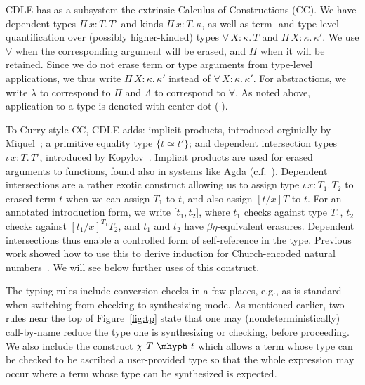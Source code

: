 \documentclass{article}
\newcommand{\abs}[4]{{#1}\, #2\! : \! #3.\, #4}
\begin{document}
CDLE has as a subsystem the extrinsic Calculus of
Constructions (CC).  We have dependent types
$\abs{\Pi}{x}{T}{T'}$ and kinds $\abs{\Pi}{x}{T}{\kappa}$, as well as
term- and type-level quantification over (possibly higher-kinded)
types $\abs{\forall}{X}{\kappa}{T}$ and
$\abs{\Pi}{X}{\kappa}{\kappa'}$.  We use $\forall$ when the
corresponding argument will be erased, and $\Pi$ when it will be
retained.  Since we do not erase term or type arguments from
type-level applications, we thus write $\abs{\Pi}{X}{\kappa}{\kappa'}$
instead of $\abs{\forall}{X}{\kappa}{\kappa'}$.
For abstractions, we write $\lambda$ to
correspond to $\Pi$ and $\Lambda$ to correspond to $\forall$.  As noted
above, application to a type is denoted with center dot ($\cdot$).

To Curry-style CC, CDLE adds: implicit products, introduced orginially
by Miquel~\cite{miquel01}; a primitive equality type $\{ t \simeq
t'\}$; and dependent intersection types $\abs{\iota}{x}{T}{T'}$,
introduced by Kopylov~\cite{kopylov03}.  Implicit products are used
for erased arguments to functions, found also in systems like Agda
(c.f.~\cite{mishraLinger08}).  Dependent intersections are a rather
exotic construct allowing us to assign type $\abs{\iota}{x}{T_1}{T_2}$ to
erased term $t$ when we can assign $T_1$ to $t$, and also assign
$[t/x]T$ to $t$.  For an annotated introduction form, we write
$[t_1,t_2$], where $t_1$ checks against type $T_1$, $t_2$ checks against
$[t_1/x]^{T_1}T_2$, and $t_1$ and $t_2$ have $\beta\eta$-equivalent
erasures.  Dependent intersections thus enable a controlled form of
self-reference in the type.  Previous work showed how to use this to
derive induction for Church-encoded natural numbers~\cite{stump18}.
We will see below further uses of this construct.

The typing rules include conversion checks in a few places, e.g., as is
standard when switching from checking to synthesizing mode.  As mentioned
earlier, two rules near the top of Figure~\ref{fig:tp} state that one may
(nondeterministically) call-by-name reduce the type one is synthesizing or
checking, before proceeding.
We also include the construct $\chi\ T\ \mhyph\ t$ which allows a term whose
type can be checked to be ascribed a user-provided type so that the whole
expression may occur where a term whose type can be synthesized is expected.
\end{document}
